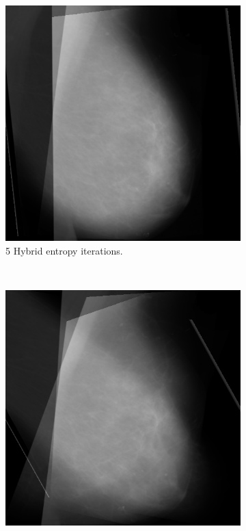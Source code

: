 \begin{figure}[H]
    \centering
    \begin{subfigure}[t]{0.3\textwidth}
        \includegraphics[width=\textwidth]{Chapter3/hybrid-img/hybrid-5.png}
        \caption{5 Hybrid entropy iterations.}
        \label{fig:5-hybrid}
    \end{subfigure} \hfill
    ~ %
    \begin{subfigure}[t]{0.3\textwidth}
      \includegraphics[width=\textwidth]{Chapter3/hybrid-img/hybrid-10.png}

\end{subfigure}
\end{figure}
